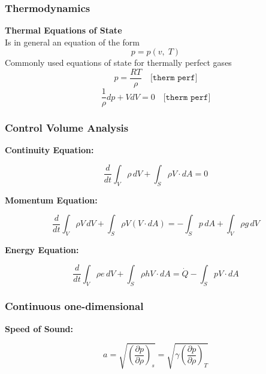\subsubsection{Thermodynamics}

\textbf{Thermal Equations of State}\\
	Is in general an equation of the form
	\begin{equation}
		p=p(v,\;T)
	\end{equation}
	Commonly used equations of state for thermally perfect gases
	\begin{equation}
		p = \frac{RT}{\rho} \quad \texttt{[therm perf]}
	\end{equation}
	\begin{equation}
		\frac{1}{\rho} dp + V dV = 0 \quad \texttt{[therm perf]}
	\end{equation}

\subsubsection{Control Volume Analysis}

\textbf{Continuity Equation:}

\begin{equation}
	\frac{d}{dt} \int_V \rho \, dV + \int_S \rho V \cdot dA = 0
\end{equation}

\textbf{Momentum Equation:}

\begin{equation}
	\frac{d}{dt} \int_V \rho V \, dV + \int_S \rho V (V \cdot dA) = - \int_S p \, dA + \int_V \rho g \, dV
\end{equation}

\textbf{Energy Equation:}

\begin{equation}
	\frac{d}{dt} \int_V \rho e \, dV + \int_S \rho h V \cdot dA = \dot{Q} - \int_S p V \cdot dA
\end{equation}

\subsubsection{Continuous one-dimensional}

\textbf{Speed of Sound:}

\begin{equation}
	a = \sqrt{\left( \frac{\partial p}{\partial \rho} \right)_s} = \sqrt{\gamma \left( \frac{\partial p}{\partial \rho} \right)_T}
\end{equation}


